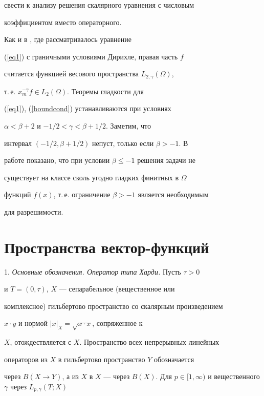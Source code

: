 свести к анализу решения скалярного уравнения с числовым


коэффициентом вместо операторного.





Как и в \cite{IzVuz03-1}, где рассматривалось уравнение


(\ref{eq1}) с граничными условиями Дирихле, правая часть $f$


считается функцией весового пространства $L_{2,\gamma}(\Omega)$,


т.\,е. $x_m^{-\gamma} f \in L_2(\Omega)$. Теоремы гладкости для


(\ref{eq1}), (\ref{boundcond}) устанавливаются при условиях


$\alpha < \beta+2$ и $-1/2 < \gamma < \beta+1/2$. Заметим, что


интервал $(-1/2, \beta+1/2)$ непуст, только если $\beta > -1$. В


работе показано, что при условии $\beta \le -1$ решения задачи не


существует на классе сколь угодно гладких финитных в $\Omega$


функций $f(x)$, т.\,е. ограничение $\beta > -1$ является необходимым


для разрешимости.








\section{Пространства вектор-функций}





1. {\it Основные обозначения. Оператор типа Харди.} Пусть $\tau >0$


и $T=(0,\tau)$, $X$ --- сепарабельное (вещественное или


комплексное) гильбертово пространство  со скалярным произведением


$x \cdot y$ и нормой ${|x|}_X=\sqrt{x\cdot x}$, сопряженное к


$X$, отождествляется с $X$. Пространство всех непрерывных линейных


операторов из $X$ в гильбертово пространство $Y$ обозначается


через $B(X \to Y)$, а из $X$ в $X$ --- через $B(X)$. Для $p \in


[1,\infty)$ и вещественного $\gamma$ через $L_{p,\gamma}(T;X)$


